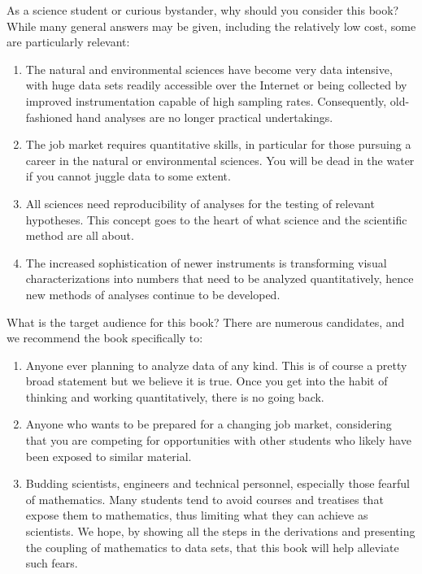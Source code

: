 As a science student or curious bystander, why should you consider this book?  While many
general answers may be given, including the relatively low cost, some are particularly relevant:

\begin{enumerate}
\item The natural and environmental sciences have become very data intensive, with huge data sets readily accessible
   over the Internet or being collected by improved instrumentation capable of high sampling rates.  Consequently, old-fashioned
   hand analyses are no longer practical undertakings.
\item The job market requires quantitative skills, in particular for those pursuing a career in the natural
   or environmental sciences.  You will be dead in the water if you cannot juggle data to some extent.
\item All sciences need reproducibility of analyses for the testing of relevant hypotheses.
   This concept goes to the heart of what science and the scientific method are all about.
\item The increased sophistication of newer instruments is transforming visual
   characterizations into numbers that need to be analyzed quantitatively, hence new methods of analyses
   continue to be developed.
\end{enumerate}

What is the target audience for this book?  There are numerous candidates,
and we recommend the book specifically to:

\begin{enumerate}
\item Anyone ever planning to analyze data of any kind. This is of course a pretty broad statement but we believe it is true.
   Once you get into the habit of thinking and working quantitatively, there is no going back.
\item Anyone who wants to be prepared for a changing job market, considering that you are competing for
   opportunities with other students who likely have been exposed to similar material.
\item Budding scientists, engineers and technical personnel, especially those fearful of mathematics. Many students
   tend to avoid courses and treatises that expose them to mathematics, thus limiting what they
   can achieve as scientists.  We hope, by showing all the steps in the derivations and presenting the coupling of
   mathematics to data sets, that this book will help alleviate such fears.
\end{enumerate}

